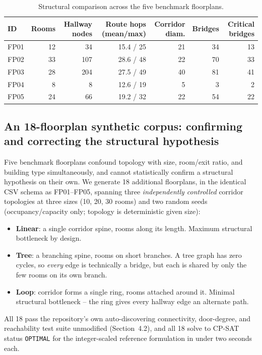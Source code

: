 \documentclass[11pt]{article}
\begin{document}
\begin{table}[h]
\centering
\caption{Structural comparison across the five benchmark floorplans.}
\label{tab:geometry}
\small
\begin{tabular}{lrrrrrr}
\toprule
ID & Rooms & Hallway nodes & Route hops (mean/max) & Corridor diam. & Bridges & Critical bridges \\
\midrule
FP01 & 12 & 34 & 15.4 / 25 & 21 & 34 & 13 \\
FP02 & 33 & 107 & 28.6 / 48 & 22 & 70 & 33 \\
FP03 & 28 & 204 & 27.5 / 49 & 40 & 81 & 41 \\
FP04 & 8 & 8 & 12.6 / 19 & 5 & 3 & 2 \\
FP05 & 24 & 66 & 19.2 / 32 & 22 & 54 & 22 \\
\bottomrule
\end{tabular}
\end{table}

\subsection{An 18-floorplan synthetic corpus: confirming and correcting the structural hypothesis}
\label{sec:synthetic}
Five benchmark floorplans confound topology with size, room/exit ratio, and building type simultaneously, and cannot statistically confirm a structural hypothesis on their own. We generate 18 additional floorplans, in the identical CSV schema as FP01--FP05, spanning three \emph{independently controlled} corridor topologies at three sizes (10, 20, 30 rooms) and two random seeds (occupancy/capacity only; topology is deterministic given size):
\begin{itemize}[leftmargin=*]
\item \textbf{Linear}: a single corridor spine, rooms along its length. Maximum structural bottleneck by design.
\item \textbf{Tree}: a branching spine, rooms on short branches. A tree graph has zero cycles, so \emph{every} edge is technically a bridge, but each is shared by only the few rooms on its own branch.
\item \textbf{Loop}: corridor forms a single ring, rooms attached around it. Minimal structural bottleneck -- the ring gives every hallway edge an alternate path.
\end{itemize}
All 18 pass the repository's own auto-discovering connectivity, door-degree, and reachability test suite unmodified (Section~4.2), and all 18 solve to CP-SAT status \texttt{OPTIMAL} for the integer-scaled reference formulation in under two seconds each.
\end{document}
